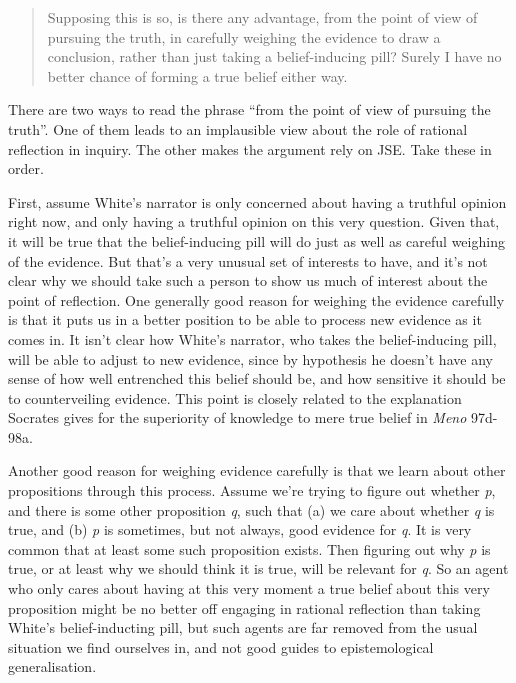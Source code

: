 \begin{quote}
Supposing this is so, is there any advantage, from the point of view of pursuing the truth, in carefully weighing the evidence to draw a conclusion, rather than just taking a belief-inducing pill? Surely I have no better chance of forming a true belief either way. ~\citep[448]{White2005}
\end{quote}
There are two ways to read the phrase ``from the point of view of pursuing the truth''. One of them leads to an implausible view about the role of rational reflection in inquiry. The other makes the argument rely on JSE. Take these in order.

First, assume White's narrator is only concerned about having a truthful opinion right now, and only having a truthful opinion on this very question. Given that, it will be true that the belief-inducing pill will do just as well as careful weighing of the evidence. But that's a very unusual set of interests to have, and it's not clear why we should take such a person to show us much of interest about the point of reflection. One generally good reason for weighing the evidence carefully is that it puts us in a better position to be able to process new evidence as it comes in. It isn't clear how White's narrator, who takes the belief-inducing pill, will be able to adjust to new evidence, since by hypothesis he doesn't have any sense of how well entrenched this belief should be, and how sensitive it should be to counterveiling evidence. This point is closely related to the explanation Socrates gives for the superiority of knowledge to mere true belief in \emph{Meno} 97d-98a.

Another good reason for weighing evidence carefully is that we learn about other propositions through this process. Assume we're trying to figure out whether \emph{p}, and there is some other proposition \emph{q}, such that (a) we care about whether \emph{q} is true, and (b) \emph{p} is sometimes, but not always, good evidence for \emph{q}. It is very common that at least some such proposition exists. Then figuring out why \emph{p} is true, or at least why we should think it is true, will be relevant for \emph{q}. So an agent who only cares about having at this very moment a true belief about this very proposition might be no better off engaging in rational reflection than taking White's belief-inducting pill, but such agents are far removed from the usual situation we find ourselves in, and not good guides to epistemological generalisation.

